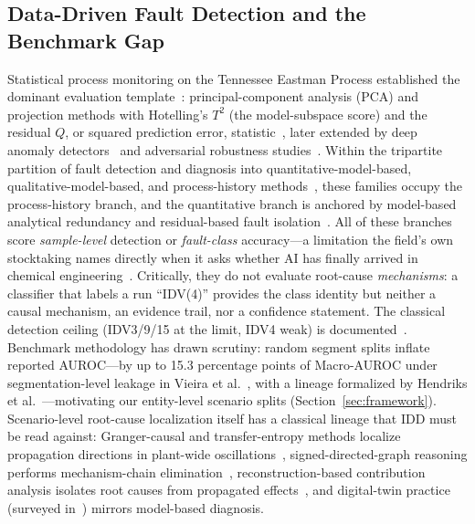 \documentclass[preprint,12pt]{elsarticle}
\begin{document}
\subsection{Data-Driven Fault Detection and the Benchmark Gap}
Statistical process monitoring on the Tennessee Eastman Process established the dominant evaluation template~\cite{downs1993plant,qin2012survey}: principal-component analysis (PCA) and projection methods with Hotelling's $T^2$ (the model-subspace score) and the residual $Q$, or squared prediction error, statistic~\cite{kano2002comparison,yin2014review}, later extended by deep anomaly detectors~\cite{hartung2023deep,tuli2022tranad} and adversarial robustness studies~\cite{pozdnyakov2024adversarial}. Within the tripartite partition of fault detection and diagnosis into quantitative-model-based, qualitative-model-based, and process-history methods~\cite{venkatasubramanian2003review,venkatasubramanian2003part2,venkatasubramanian2003part3}, these families occupy the process-history branch, and the quantitative branch is anchored by model-based analytical redundancy and residual-based fault isolation~\cite{isermann2005model}. All of these branches score \emph{sample-level} detection or \emph{fault-class} accuracy---a limitation the field's own stocktaking names directly when it asks whether AI has finally arrived in chemical engineering~\cite{venkatasubramanian2019promise}. Critically, they do not evaluate root-cause \emph{mechanisms}: a classifier that labels a run ``IDV(4)'' provides the class identity but neither a causal mechanism, an evidence trail, nor a confidence statement. The classical detection ceiling (IDV3/9/15 at the limit, IDV4 weak) is documented~\cite{russell2000delay,chiang2001fault}. Benchmark methodology has drawn scrutiny: random segment splits inflate reported AUROC---by up to 15.3 percentage points of Macro-AUROC under segmentation-level leakage in Vieira et al.~\cite{vieira2026towards}, with a lineage formalized by Hendriks et al.~\cite{hendriks2022towards}---motivating our entity-level scenario splits (Section~\ref{sec:framework}). Scenario-level root-cause localization itself has a classical lineage that IDD must be read against: Granger-causal and transfer-entropy methods localize propagation directions in plant-wide oscillations~\cite{yuan2014root,bauer2007finding,yoon2001statistical,thornhill2007fault}, signed-directed-graph reasoning performs mechanism-chain elimination~\cite{iri1979algorithm}, reconstruction-based contribution analysis isolates root causes from propagated effects~\cite{dunia1996identification,alcala2009reconstruction}, and digital-twin practice (surveyed in~\cite{tao2019digital}) mirrors model-based diagnosis.
\end{document}
